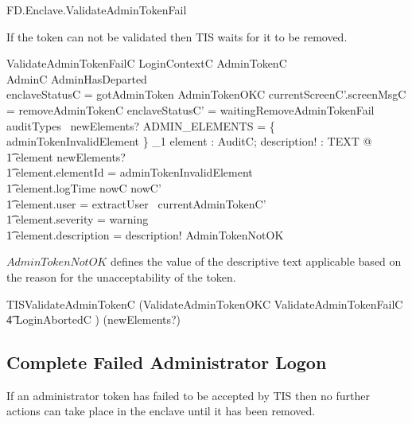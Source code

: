 \begin{traceunit}{FD.Enclave.ValidateAdminTokenFail}
\end{traceunit}

If the token can not be validated then TIS waits for it to be removed.

\begin{schema}{ValidateAdminTokenFailC}
        LoginContextC
\also
        \Xi AdminTokenC
\\      \Xi AdminC
\where
        \lnot AdminHasDeparted
\\      enclaveStatusC = gotAdminToken
\also
        \lnot AdminTokenOKC
\also
        currentScreenC'.screenMsgC = removeAdminTokenC
\also
        enclaveStatusC' = waitingRemoveAdminTokenFail
\also
        auditTypes~ newElements? \cap ADMIN\_ELEMENTS = 
        \{ adminTokenInvalidElement \} 
\also
        \exists_1 element : AuditC; description! : TEXT @ 
\\ \t1  element \in newElements? 
\\ \t1  \land element.elementId = adminTokenInvalidElement
\\ \t1  \land element.logTime \in nowC \upto nowC'
\\ \t1  \land element.user = extractUser~ currentAdminTokenC'
\\ \t1  \land element.severity = warning
\\ \t1  \land element.description = description! \land AdminTokenNotOK
\end{schema}
\begin{Zcomment}
\item
$AdminTokenNotOK$ defines the value of the descriptive text applicable
based on the reason for the unacceptability of the token.
\end{Zcomment}


\begin{zed}
        TISValidateAdminTokenC  (ValidateAdminTokenOKC \lor
        ValidateAdminTokenFailC 
\\ \t4  \lor
        LoginAbortedC )
        \hide (newElements?)
\end{zed}

\subsection{Complete Failed Administrator Logon}

If an administrator token has failed to be accepted by TIS 
then no further actions can take place in the enclave until it has 
been removed.

